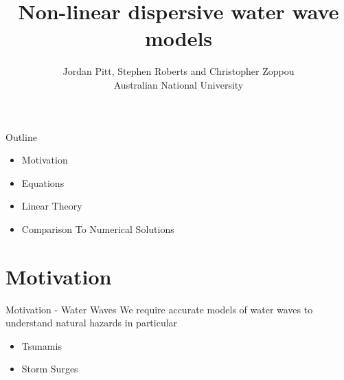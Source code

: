 \documentclass[pdf]{beamer}
\title{Non-linear dispersive water wave models}
\author{Jordan Pitt, Stephen Roberts and Christopher Zoppou \\ Australian National University}
\begin{document}
\begin{frame}[plain]{}
\end{frame}
	
	
\begin{frame}
\titlepage
\end{frame}
	


\begin{frame}{Outline}
	\begin{itemize}
		\item Motivation
		\item Equations
		\item Linear Theory
		\item Comparison To Numerical Solutions
	\end{itemize}
\end{frame}
\section{Motivation}
\begin{frame}{Motivation - Water Waves}
We require accurate models of water waves to understand natural hazards in particular
	\begin{itemize}
		\item Tsunamis
		\item Storm Surges
	\end{itemize}
\end{frame}
\end{document}

